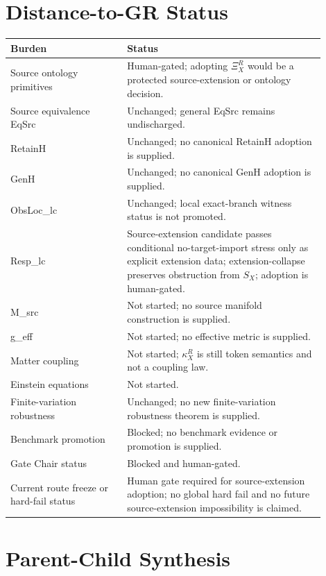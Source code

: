 \documentclass[11pt]{article}
\newcommand{\XiR}{\Xi_X^R}
\newcommand{\SX}{S_X}
\begin{document}
\section{Distance-to-GR Status}

\begin{center}
\begin{tabular}{p{0.33\linewidth}p{0.57\linewidth}}
\hline
Burden & Status \\
\hline
Source ontology primitives & Human-gated; adopting \(\XiR\) would be a protected source-extension or ontology decision. \\
Source equivalence EqSrc & Unchanged; general EqSrc remains undischarged. \\
RetainH & Unchanged; no canonical RetainH adoption is supplied. \\
GenH & Unchanged; no canonical GenH adoption is supplied. \\
ObsLoc\_lc & Unchanged; local exact-branch witness status is not promoted. \\
Resp\_lc & Source-extension candidate passes conditional no-target-import stress only as explicit extension data; extension-collapse preserves obstruction from \(\SX\); adoption is human-gated. \\
M\_src & Not started; no source manifold construction is supplied. \\
g\_eff & Not started; no effective metric is supplied. \\
Matter coupling & Not started; \(\kappa_X^R\) is still token semantics and not a coupling law. \\
Einstein equations & Not started. \\
Finite-variation robustness & Unchanged; no new finite-variation robustness theorem is supplied. \\
Benchmark promotion & Blocked; no benchmark evidence or promotion is supplied. \\
Gate Chair status & Blocked and human-gated. \\
Current route freeze or hard-fail status & Human gate required for source-extension adoption; no global hard fail and no future source-extension impossibility is claimed. \\
\hline
\end{tabular}
\end{center}

\section{Parent-Child Synthesis}
\end{document}
